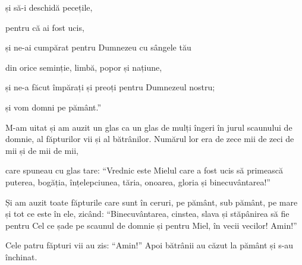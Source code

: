 {\par }{\QB și să-i deschidă pecețile,

\par }{\Q pentru că ai fost ucis,

\par }{\QB și ne-ai cumpărat pentru Dumnezeu cu sângele tău

\par }{\QB din orice seminție, limbă, popor și națiune,


\par }{\Q {}și ne-a făcut împărați și preoți pentru Dumnezeul nostru;

\par }{\QB și vom domni pe pământ.”


\par }{\PP {}M-am uitat și am auzit un glas ca un glas de mulți îngeri în jurul scaunului de domnie, al făpturilor vii și al bătrânilor. Numărul lor era de zece mii de zeci de mii și de mii de mii,

care spuneau cu glas tare: “Vrednic este Mielul care a fost ucis să primească puterea, bogăția, înțelepciunea, tăria, onoarea, gloria și binecuvântarea!”


\par }{\PP {}Și am auzit toate făpturile care sunt în ceruri, pe pământ, sub pământ, pe mare și tot ce este în ele, zicând: “Binecuvântarea, cinstea, slava și stăpânirea să fie pentru Cel ce șade pe scaunul de domnie și pentru Miel, în vecii vecilor! Amin!”


\par }{\PP {}Cele patru făpturi vii au zis: “Amin!” Apoi
bătrânii au căzut la pământ și s-au închinat.



\par }
